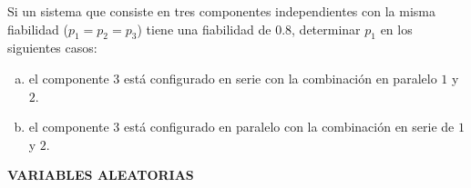 \documentclass[12pt]{article}
\begin{document}
\probl  Si un sistema que consiste en tres componentes independientes con la misma
fiabilidad ($p_1=p_2=p_3$) tiene una fiabilidad de $0.8$, determinar $p_1$ en los
siguientes casos:

\begin{enumerate}[a)]
\item el componente 3 está configurado en serie con la combinación en paralelo
$1$ y $2$.
 \item el componente 3 está configurado en paralelo
con la combinación en serie de $1$ y $2$.
\end{enumerate}



%
\newpage

\begin{centerline}
{{\bf VARIABLES ALEATORIAS}}
\end{centerline}
\end{document}
